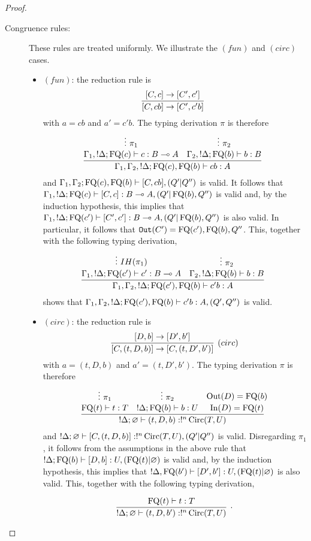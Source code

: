 \documentclass[twoside]{article}
\begin{document}
\begin{proof}
\begin{description}
\item[Congruence rules:] These rules are treated uniformly. We illustrate the 
$(fun)$ and $(circ)$ cases.
\begin{itemize}
  \item $(fun)$: the reduction rule is
  \[
    \infer[]{[C,cb]\to[C',c'b]}{
      [C,c]\to[C',c']
    }
  \]
  with $a=cb$ and $a'=c'b$. The typing derivation $\pi$ is therefore
  \[
    \infer[]{\Gamma_1,\Gamma_2, !\Delta;\FQ(c),\FQ(b)\entails cb:A}{
      \deduce[]{\Gamma_1, !\Delta;\FQ(c)\entails c:B\loli A}{
        \vdots~\pi_1
      } 
      &
      \deduce[]{\Gamma_2, !\Delta ;\FQ(b)\entails b:B}{
        \vdots~\pi_2
      } 
    }
  \]
  and $\Gamma_1,\Gamma_2;\mathop{\textrm{FQ}}\nolimits(c),\mathop{\textrm{FQ}}\nolimits(b)\vdash [C, cb],(Q'|Q'')$ is valid.
  It follows that $\Gamma_1, !\Delta;\mathop{\textrm{FQ}}\nolimits(c)\vdash [C,c]:B\multimap A,(Q'|\mathop{\textrm{FQ}}\nolimits(b),Q'')$ 
  is valid and, by the induction hypothesis, this implies that 
  $\Gamma_1, !\Delta;\mathop{\textrm{FQ}}\nolimits(c')\vdash [C',c']:B\multimap A,(Q'|\mathop{\textrm{FQ}}\nolimits(b),Q'')$ is also valid.
  In particular, it follows that $\mathtt{Out}(C')=\mathop{\textrm{FQ}}\nolimits(c'),\mathop{\textrm{FQ}}\nolimits(b),Q''$. This, 
  together with the following typing derivation,
  \[
    \infer[]{\Gamma_1,\Gamma_2, !\Delta;\FQ(c'),\FQ(b)\entails c'b:A}{
      \deduce[]{\Gamma_1, !\Delta;\FQ(c')\entails c':B\loli A}{
        \vdots~IH(\pi_1)
      } 
      &
      \deduce[]{\Gamma_2, !\Delta ;\FQ(b)\entails b:B}{
        \vdots~\pi_2
      } 
    }
  \]  
  shows that $\Gamma_1,\Gamma_2, !\Delta;\mathop{\textrm{FQ}}\nolimits(c'),\mathop{\textrm{FQ}}\nolimits(b)\vdash c'b:A,(Q',Q'')$ 
  is valid.
  \item $(circ)$: the reduction rule is
  \[
    \infer[(circ)]{[C, (t,D,b)]\to [C, (t,D',b')]}{
      [D,b]\to [D',b']
    }
  \]  
  with $a=(t,D,b)$ and $a'=(t,D',b')$. The typing derivation $\pi$ is therefore
  \[
  \infer[]{!\Delta;\varnothing\entails (t,D,b):!^n\Circ(T,U)}{
    \deduce[]{\FQ(t)\entails t:T}{
      \vdots~\pi_1
    } 
    &
    \deduce[]{!\Delta ; \FQ(b)\entails b:U}{
      \vdots~\pi_2
    }
    &
    \deduce[]{\In(D)=\FQ(t)}{
      \Out(D)=\FQ(b)
    }
  }
  \]  
  and $!\Delta ; \varnothing \vdash [C,(t,D,b)]:!^n\mathop{\textrm{Circ}}\nolimits(T,U),(Q'|Q'')$ is valid. 
  Disregarding $\pi_1$, it follows from the assumptions in the above rule 
  that $!\Delta ; \mathop{\textrm{FQ}}\nolimits(b)\vdash [D,b]:U, (\mathop{\textrm{FQ}}\nolimits(t)|\varnothing)$ is valid and, 
  by the induction hypothesis, this implies that 
  $!\Delta,\mathop{\textrm{FQ}}\nolimits(b')\vdash [D',b']:U,(\mathop{\textrm{FQ}}\nolimits(t)|\varnothing)$ is also valid.
  This, together with the following typing derivation,
  \[
  \infer[.]{!\Delta;\varnothing\entails (t,D,b'):!^n\Circ(T,U)}{
    \deduce[]{\FQ(t)\entails t:T}{
}}\]
\end{itemize}
\end{description}
\end{proof}
\end{document}
